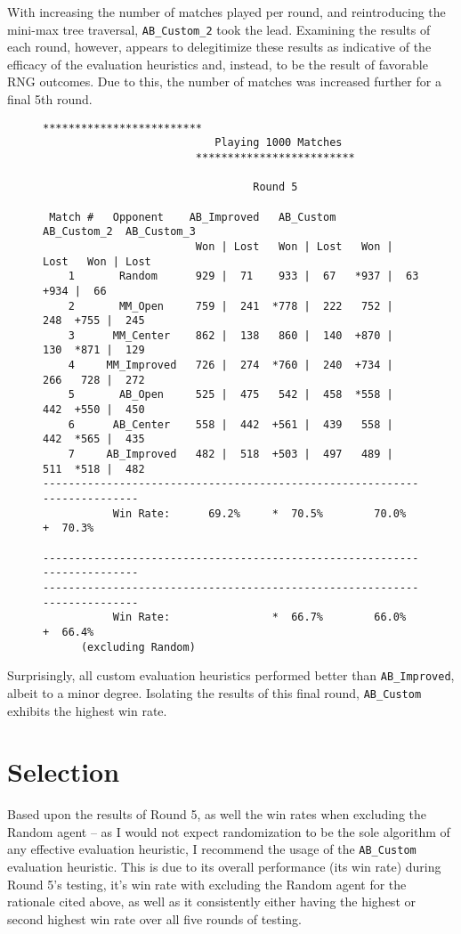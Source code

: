 \documentclass[12pt]{article}
\newcommand{\code}[2][python]{\texttt{#2}}
\begin{document}
With increasing the number of matches played per round, and reintroducing
the mini-max tree traversal, \code{AB_Custom_2} took the lead. Examining
the results of each round, however, appears to delegitimize these results as
indicative of the efficacy of the evaluation heuristics and, instead, to 
be the result of favorable RNG outcomes. Due to this, the number of matches was
increased further for a final 5th round.

\begin{figure}[H]
\begin{Verbatim}[fontsize=\footnotesize]
                        *************************                         
                           Playing 1000 Matches                              
                        *************************                         

                                 Round 5

 Match #   Opponent    AB_Improved   AB_Custom   AB_Custom_2  AB_Custom_3 
                        Won | Lost   Won | Lost   Won | Lost   Won | Lost 
    1       Random      929 |  71    933 |  67   *937 |  63   +934 |  66  
    2       MM_Open     759 |  241  *778 |  222   752 |  248  +755 |  245 
    3      MM_Center    862 |  138   860 |  140  +870 |  130  *871 |  129 
    4     MM_Improved   726 |  274  *760 |  240  +734 |  266   728 |  272 
    5       AB_Open     525 |  475   542 |  458  *558 |  442  +550 |  450 
    6      AB_Center    558 |  442  +561 |  439   558 |  442  *565 |  435 
    7     AB_Improved   482 |  518  +503 |  497   489 |  511  *518 |  482 
--------------------------------------------------------------------------
           Win Rate:      69.2%     *  70.5%        70.0%     +  70.3%    

--------------------------------------------------------------------------
--------------------------------------------------------------------------
           Win Rate:                *  66.7%        66.0%     +  66.4%
      (excluding Random)
\end{Verbatim}
\end{figure}

Surprisingly, all custom evaluation heuristics performed better than
\code{AB_Improved}, albeit to a minor degree. Isolating the results of this
final round, \code{AB_Custom} exhibits the highest win rate. 
\section*{Selection}
Based upon the results of Round 5, as well the win rates when excluding the 
Random agent -- as I would not expect randomization to be the sole algorithm of
any effective evaluation heuristic, I recommend the usage of the 
\code{AB_Custom} evaluation heuristic. This is due to its overall performance
(its win rate) during Round 5's testing, it's win rate with excluding the
Random agent for the rationale cited above, as well as it consistently either
having the highest or second highest win rate over all five rounds of testing.
\end{document}

